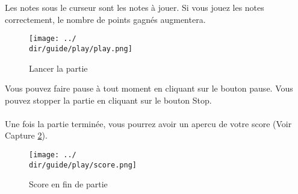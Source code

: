 Les notes sous le curseur sont les notes à jouer. Si vous jouez les notes correctement, le nombre de points gagnés augmentera.

\begin{figure}[H]
	\texttt{[image: ../\\dir/guide/play/play.png]}
	\caption{Lancer la partie}
	\label{fig:play}
\end{figure}

Vous pouvez faire pause à tout moment en cliquant sur le bouton pause. Vous pouvez stopper la partie en cliquant sur le bouton Stop.
\\\\
Une fois la partie terminée, vous pourrez avoir un apercu de votre score (Voir Capture \ref{fig:score}).

\begin{figure}[H]
	\texttt{[image: ../\\dir/guide/play/score.png]}
	\caption{Score en fin de partie}
	\label{fig:score}
\end{figure}